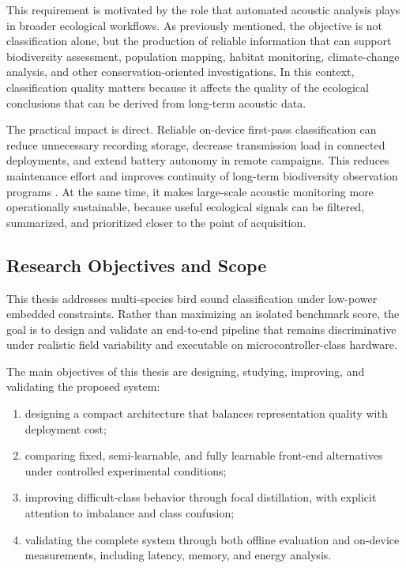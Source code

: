 \documentclass[a4paper,singleside,12pt]{report} %
\begin{document}
This requirement is motivated by the role that automated acoustic analysis plays in broader ecological workflows. As previously mentioned, the objective is not classification alone, but the production of reliable information that can support biodiversity assessment, population mapping, habitat monitoring, climate-change analysis, and other conservation-oriented investigations. In this context, classification quality matters because it affects the quality of the ecological conclusions that can be derived from long-term acoustic data.

The practical impact is direct. Reliable on-device first-pass classification can reduce unnecessary recording storage, decrease transmission load in connected deployments, and extend battery autonomy in remote campaigns. This reduces maintenance effort and improves continuity of long-term biodiversity observation programs \cite{sabbella2022alwayson,tinychirp2024,gallacher2021shazam}. At the same time, it makes large-scale acoustic monitoring more operationally sustainable, because useful ecological signals can be filtered, summarized, and prioritized closer to the point of acquisition.

	\subsection{Research Objectives and Scope}
	This thesis addresses multi-species bird sound classification under low-power embedded constraints. Rather than maximizing an isolated benchmark score, the goal is to design and validate an end-to-end pipeline that remains discriminative under realistic field variability and executable on microcontroller-class hardware.

	The main objectives of this thesis are designing, studying, improving, and validating the proposed system:
	\begin{enumerate}
		\item designing a compact architecture that balances representation quality with deployment cost;
		\item comparing fixed, semi-learnable, and fully learnable front-end alternatives under controlled experimental conditions;
		\item improving difficult-class behavior through focal distillation, with explicit attention to imbalance and class confusion;
		\item validating the complete system through both offline evaluation and on-device measurements, including latency, memory, and energy analysis.
	\end{enumerate}
\end{document}
